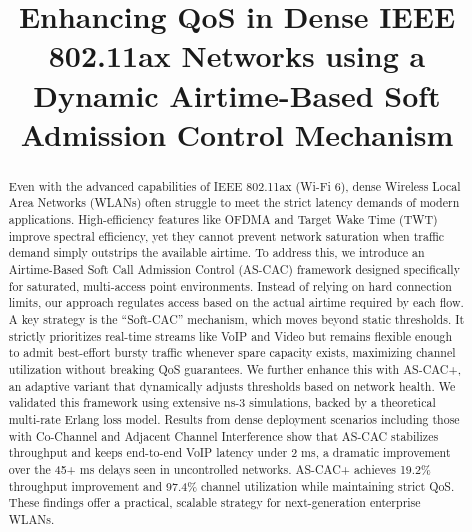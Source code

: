 \documentclass[conference]{IEEEtran}
\begin{document}
\title{Enhancing QoS in Dense IEEE 802.11ax Networks using a Dynamic Airtime-Based Soft Admission Control Mechanism}

\author{
}

\maketitle

\begin{abstract}
Even with the advanced capabilities of IEEE 802.11ax (Wi-Fi 6), dense Wireless Local Area Networks (WLANs) often struggle to meet the strict latency demands of modern applications. High-efficiency features like OFDMA and Target Wake Time (TWT) improve spectral efficiency, yet they cannot prevent network saturation when traffic demand simply outstrips the available airtime. To address this, we introduce an Airtime-Based Soft Call Admission Control (AS-CAC) framework designed specifically for saturated, multi-access point environments. Instead of relying on hard connection limits, our approach regulates access based on the actual airtime required by each flow. A key strategy is the ``Soft-CAC'' mechanism, which moves beyond static thresholds. It strictly prioritizes real-time streams like VoIP and Video but remains flexible enough to admit best-effort bursty traffic whenever spare capacity exists, maximizing channel utilization without breaking QoS guarantees. We further enhance this with AS-CAC+, an adaptive variant that dynamically adjusts thresholds based on network health. We validated this framework using extensive ns-3 simulations, backed by a theoretical multi-rate Erlang loss model. Results from dense deployment scenarios including those with Co-Channel and Adjacent Channel Interference show that AS-CAC stabilizes throughput and keeps end-to-end VoIP latency under 2 ms, a dramatic improvement over the 45+ ms delays seen in uncontrolled networks. AS-CAC+ achieves 19.2\% throughput improvement and 97.4\% channel utilization while maintaining strict QoS. These findings offer a practical, scalable strategy for next-generation enterprise WLANs.
\end{abstract}
\end{document}
